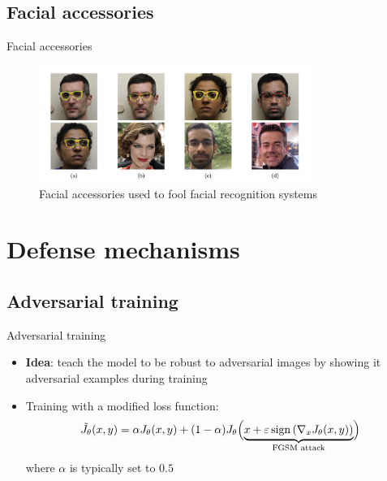 \documentclass[aspectratio=169]{beamer}
\theoremstyle{definition}
\renewcommand{\epsilon}{\varepsilon}
\DeclareMathOperator*{\sign}{sign}
\begin{document}
\subsection{Facial accessories}
\begin{frame}{Facial accessories}
  \begin{figure}
    \centering
    \includegraphics[width=0.8\textwidth]{facial-accessories.png}
    \caption{Facial accessories used to fool facial recognition systems}
  \end{figure}
\end{frame}

\section{Defense mechanisms}
\subsection{Adversarial training}
\begin{frame}{Adversarial training}
  \begin{itemize}
    \item \textbf{Idea}: teach the model to be robust to adversarial images by showing it adversarial examples during training
    \item Training with a modified loss function:
    \begin{equation*}
      \tilde{J}_\theta(x, y) = \alpha J_\theta(x, y) + (1-\alpha)J_\theta\Bigl(\underbrace{x+\epsilon\sign\left(\nabla_x J_\theta(x, y)\right)}_{\text{FGSM attack}}\Bigr)
    \end{equation*}
    where $\alpha$ is typically set to $0.5$
  \end{itemize}
\end{frame}
\end{document}
